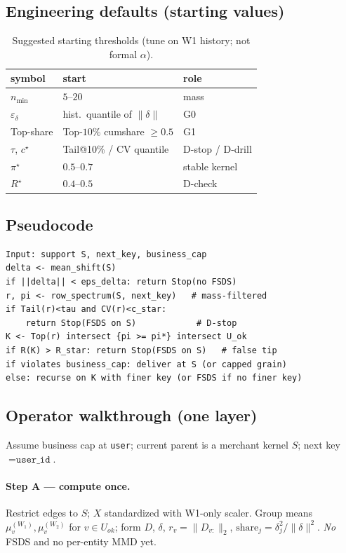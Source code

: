 \documentclass[11pt]{article}
\begin{document}
\subsection{Engineering defaults (starting values)}
\begin{table}[h]
\centering
\caption{Suggested starting thresholds (tune on W1 history; not formal $\alpha$).}
\label{tab:thresh}
\begin{tabular}{lll}
\toprule
symbol & start & role \\
\midrule
$n_{\min}$ & $5$--$20$ & mass \\
$\varepsilon_\delta$ & hist.\ quantile of $\|\delta\|$ & G0 \\
Top-share & Top-$10\%$ cumshare $\ge 0.5$ & G1 \\
$\tau$, $c^\star$ & Tail@10\% / CV quantile & D-stop / D-drill \\
$\pi^\star$ & $0.5$--$0.7$ & stable kernel \\
$R^\star$ & $0.4$--$0.5$ & D-check \\
\bottomrule
\end{tabular}
\end{table}

\subsection{Pseudocode}
\begin{verbatim}
Input: support S, next_key, business_cap
delta <- mean_shift(S)
if ||delta|| < eps_delta: return Stop(no FSDS)
r, pi <- row_spectrum(S, next_key)   # mass-filtered
if Tail(r)<tau and CV(r)<c_star:
    return Stop(FSDS on S)            # D-stop
K <- Top(r) intersect {pi >= pi*} intersect U_ok
if R(K) > R_star: return Stop(FSDS on S)   # false tip
if violates business_cap: deliver at S (or capped grain)
else: recurse on K with finer key (or FSDS if no finer key)
\end{verbatim}

\subsection{Operator walkthrough (one layer)}
Assume business cap at \texttt{user}; current parent is a merchant
kernel \(S\); next key \(=\texttt{user\_id}\).

\paragraph{Step A --- compute once.}
Restrict edges to \(S\); \(X\) standardized with W1-only scaler.
Group means \(\mu_v^{(W_1)},\mu_v^{(W_2)}\) for \(v\in U_{ok}\);
form \(D\), \(\delta\), \(r_v=\|D_{v:}\|_2\),
\(\mathrm{share}_j=\delta_j^2/\|\delta\|^2\).
\emph{No} FSDS and no per-entity MMD yet.
\end{document}
